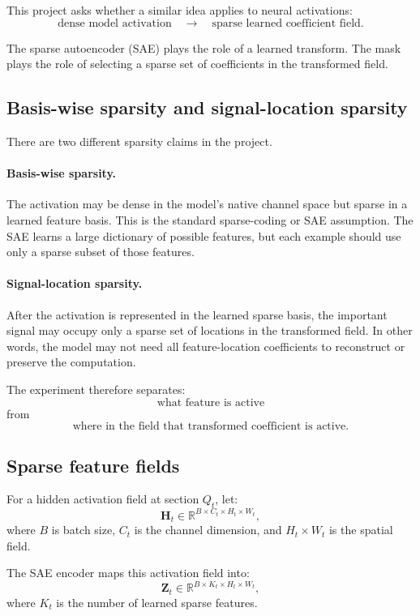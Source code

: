 \documentclass[11pt]{article}
\newcommand{\R}{\mathbb{R}}
\newcommand{\Htens}{\mathbf{H}}
\newcommand{\Ztens}{\mathbf{Z}}
\begin{document}
This project asks whether a similar idea applies to neural activations:
\[
\text{dense model activation}
\quad\longrightarrow\quad
\text{sparse learned coefficient field}.
\]

The sparse autoencoder (SAE) plays the role of a learned transform. The mask plays the role of selecting a sparse set of coefficients in the transformed field.

\subsection{Basis-wise sparsity and signal-location sparsity}

There are two different sparsity claims in the project.

\paragraph{Basis-wise sparsity.}
The activation may be dense in the model's native channel space but sparse in a learned feature basis. This is the standard sparse-coding or SAE assumption. The SAE learns a large dictionary of possible features, but each example should use only a sparse subset of those features.

\paragraph{Signal-location sparsity.}
After the activation is represented in the learned sparse basis, the important signal may occupy only a sparse set of locations in the transformed field. In other words, the model may not need all feature-location coefficients to reconstruct or preserve the computation.

The experiment therefore separates:
\[
\text{what feature is active}
\]
from
\[
\text{where in the field that transformed coefficient is active}.
\]

\subsection{Sparse feature fields}

For a hidden activation field at section \(Q_t\), let:
\[
\Htens_t \in \R^{B \times C_t \times H_t \times W_t},
\]
where \(B\) is batch size, \(C_t\) is the channel dimension, and \(H_t \times W_t\) is the spatial field.

The SAE encoder maps this activation field into:
\[
\Ztens_t \in \R^{B \times K_t \times H_t \times W_t},
\]
where \(K_t\) is the number of learned sparse features.
\end{document}
